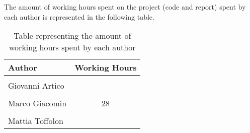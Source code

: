 \noindent
The amount of working hours spent on the project (code and report) spent by each author is represented in the following table.
\begin{table}[h]
    \centering
    \begin{tabular}{|l|c|}
        \hline
        \textbf{Author} & \textbf{Working Hours} \\ \hline
        \\[-1em]
        Giovanni Artico & \\ \hline
        \\[-1em]
        Marco Giacomin & 28 \\ \hline
        \\[-1em]
        Mattia Toffolon & \\ \hline
    \end{tabular}
    \caption{Table representing the amount of working hours spent by each author}
\end{table}